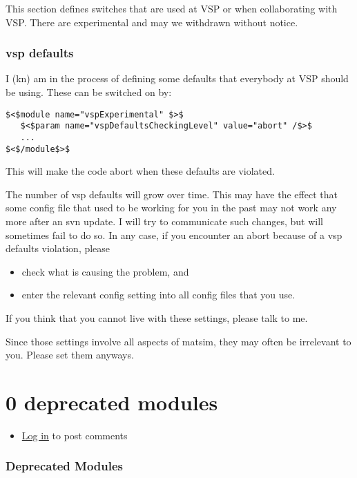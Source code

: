 \documentclass[a4paper,11pt]{report}
\begin{document}
This  section defines switches that are used at VSP or when collaborating  with VSP. There are experimental and may we withdrawn without  notice.

\subsubsection{vsp defaults}

I (kn) am in the process of defining some defaults that everybody at VSP should be using. These can be switched on by:
\begin{verbatim}
$<$module name="vspExperimental" $>$
   $<$param name="vspDefaultsCheckingLevel" value="abort" /$>$
   ...
$<$/module$>$

\end{verbatim}

This will make the code abort when these defaults are violated.

The number of vsp defaults will grow over time. This may have  the effect that some config file that used to be working for you in the  past may not work any more after an svn update. I will try to  communicate such changes, but will sometimes fail to do so. In any  case, if you encounter an abort because of a vsp defaults violation,  please
\begin{itemize}
	\item check what is causing the problem, and
	\item enter the relevant config setting into all config files that you use.
\end{itemize}

If you think that you cannot live with these settings, please talk to me.

Since those settings involve all aspects of matsim, they may often be irrelevant to you. Please set them anyways.

\vfill\eject
\section{0 deprecated modules}
\begin{itemize}
	\item \href{http://www.matsim.org/user/login?destination=comment/reply/508%23comment-form}{Log in} to post comments
\end{itemize}

\subsubsection{Deprecated Modules}
\end{document}
